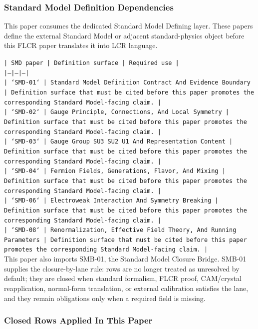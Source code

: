 \documentclass[11pt]{article}
\begin{document}
\subsubsection*{Standard Model Definition Dependencies}

This paper consumes the dedicated Standard Model Defining layer. These papers define the external Standard Model or adjacent standard-physics object before this FLCR paper translates it into LCR language.

\noindent\texttt{| SMD paper | Definition surface | Required use |}\\
\noindent\texttt{|---|---|---|}\\
\noindent\texttt{| `SMD-01` | Standard Model Definition Contract And Evidence Boundary | Definition surface that must be cited before this paper promotes the corresponding Standard Model-facing claim. |}\\
\noindent\texttt{| `SMD-02` | Gauge Principle, Connections, And Local Symmetry | Definition surface that must be cited before this paper promotes the corresponding Standard Model-facing claim. |}\\
\noindent\texttt{| `SMD-03` | Gauge Group SU3 SU2 U1 And Representation Content | Definition surface that must be cited before this paper promotes the corresponding Standard Model-facing claim. |}\\
\noindent\texttt{| `SMD-04` | Fermion Fields, Generations, Flavor, And Mixing | Definition surface that must be cited before this paper promotes the corresponding Standard Model-facing claim. |}\\
\noindent\texttt{| `SMD-06` | Electroweak Interaction And Symmetry Breaking | Definition surface that must be cited before this paper promotes the corresponding Standard Model-facing claim. |}\\
\noindent\texttt{| `SMD-08` | Renormalization, Effective Field Theory, And Running Parameters | Definition surface that must be cited before this paper promotes the corresponding Standard Model-facing claim. |}\\

This paper also imports SMB-01, the Standard Model Closure Bridge. SMB-01 supplies the closure-by-lane rule: rows are no longer treated as unresolved by default; they are closed when standard formalism, FLCR proof, CAM/crystal reapplication, normal-form translation, or external calibration satisfies the lane, and they remain obligations only when a required field is missing.

\subsubsection*{Closed Rows Applied In This Paper}
\end{document}
